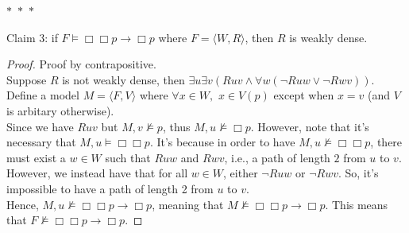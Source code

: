 \documentclass[12pt]{article}
\newcommand{\B}{\Box}
\newcommand{\s}{\vDash}
\newcommand{\ns}{\nvDash}
\begin{document}
\noindent
\begin{center}
    $\ast$~$\ast$~$\ast$
\end{center}
Claim 3: if $F \vDash \B \B p \rightarrow \B p$ where $F = \langle W, R \rangle$, then $R$ is weakly dense. 
\begin{proof} Proof by contrapositive.\\
    Suppose $R$ is not weakly dense, then $\exists u \exists v (Ruv \land \forall w(\neg Ruw \lor \neg Rwv))$.
    Define a model $M = \langle F, V \rangle$ where $\forall x \in W,$ $x \in V(p)$ except when $x = v$ (and $V$ is arbitary otherwise).\\
    Since we have $Ruv$ but $M, v \ns p$, thus $M, u \ns \B p$.
    However, note that it's necessary that $M, u \s \B \B p$.
    It's because in order to have $M, u \ns \B \B p$, there must exist a $w \in W$ such that $Ruw$ and $Rwv$, i.e., a path of length $2$ from $u$ to $v$.
    However, we instead have that for all $w \in W$, either $\neg Ruw$ or $\neg Rwv$.
    So, it's impossible to have a path of length 2 from $u$ to $v$.\\
    Hence, $M, u \ns \B \B p \to \B p$, meaning that $M \ns \B \B p \to \B p$.
    This means that $F \ns \B \B p \to \B p$.

\end{proof}
\end{document}
